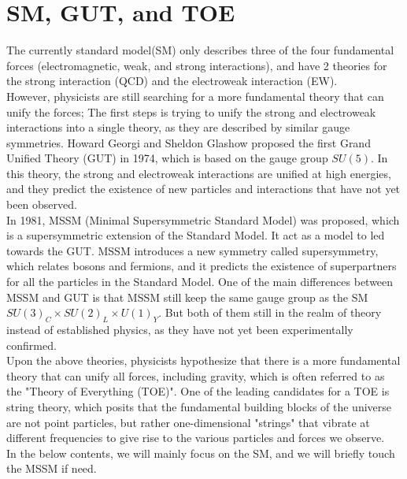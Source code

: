 \clearpage
\section{SM, GUT, and TOE}
\begin{extra}
    The currently standard model(SM) only describes three of the four fundamental forces (electromagnetic, weak, and strong interactions), and have 2 theories for the strong interaction (QCD) and the electroweak interaction (EW). \\

    However, physicists are still searching for a more fundamental theory that can unify the forces; The first steps is trying to unify the strong and electroweak interactions into a single theory, as they are described by similar gauge symmetries. Howard Georgi and Sheldon Glashow proposed the first Grand Unified Theory (GUT) in 1974, which is based on the gauge group $SU(5)$. In this theory, the strong and electroweak interactions are unified at high energies, and they predict the existence of new particles and interactions that have not yet been observed. \\

    In 1981, MSSM (Minimal Supersymmetric Standard Model) was proposed, which is a supersymmetric extension of the Standard Model. It act as a model to led towards the GUT. MSSM introduces a new symmetry called supersymmetry, which relates bosons and fermions, and it predicts the existence of superpartners for all the particles in the Standard Model. One of the main differences between MSSM and GUT is that MSSM still keep the same gauge group as the SM $SU(3)_C \times SU(2)_L \times U(1)_Y$. But both of them still in the realm of theory instead of established physics, as they have not yet been experimentally confirmed. \\

    Upon the above theories, physicists hypothesize that there is a more fundamental theory that can unify all forces, including gravity, which is often referred to as the "Theory of Everything (TOE)". One of the leading candidates for a TOE is string theory, which posits that the fundamental building blocks of the universe are not point particles, but rather one-dimensional "strings" that vibrate at different frequencies to give rise to the various particles and forces we observe. \\

    In the below contents, we will mainly focus on the SM, and we will briefly touch the MSSM if need.
\end{extra}